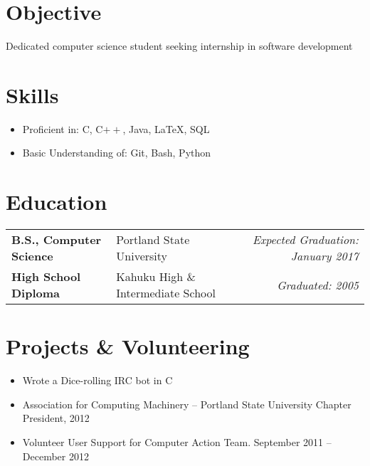 \documentclass[letterpaper,11pt]{article}
\def\objective{Dedicated computer science student seeking internship in software development}
\newcommand{\education}{%
  \begin{tabular}{ llr }
}
\newcommand{\schoolentry}[3]{%
  \textbf{#1} & #2 & \emph{#3} \vspace{3pt} \\
}
\newcommand{\fineducation}{%
  \end{tabular}
}
\begin{document}
\section{Objective} \objective

\section{Skills}
  \begin{itemize}
    \item Proficient in: C, C$++$, Java, \LaTeX, SQL
    \item Basic Understanding of: Git, Bash, Python
  \end{itemize}

\section{Education}
  \education
    \schoolentry{B.S., Computer Science}{Portland State University}{Expected Graduation: January 2017}
    \schoolentry{High School Diploma}{Kahuku High \& Intermediate School}{Graduated: 2005}
  \fineducation

\section{Projects \& Volunteering}
  \begin{itemize}[nosep,label=$\bullet$]
    \item Wrote a Dice-rolling IRC bot in C
    \item Association for Computing Machinery -- Portland State University Chapter President, 2012
    \item Volunteer User Support for Computer Action Team. September 2011 -- December 2012
  \end{itemize}
\end{document}
